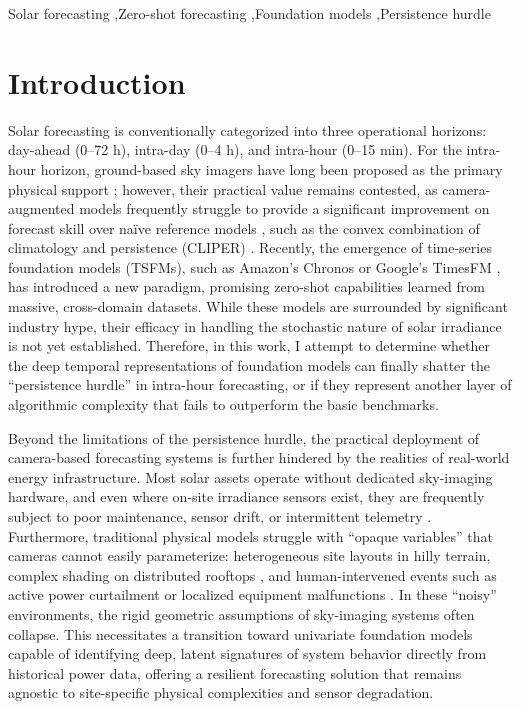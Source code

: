 \documentclass[number, 3p, 10pt, times]{elsarticle}
\begin{document}
\begin{frontmatter}
\begin{keyword}
Solar forecasting \sep Zero-shot forecasting \sep Foundation models \sep Persistence hurdle\\
\end{keyword}


\end{frontmatter}

\newpage 


\section{Introduction}\label{sec:intro}

Solar forecasting is conventionally categorized into three operational horizons: day-ahead (0--72 h), intra-day (0--4 h), and intra-hour (0--15 min). For the intra-hour horizon, ground-based sky imagers have long been proposed as the primary physical support \citep{YangBook}; however, their practical value remains contested, as camera-augmented models frequently struggle to provide a significant improvement on forecast skill over na{\"i}ve reference models \citep{Nouri2025}, such as the convex combination of climatology and persistence (CLIPER) \citep{YANG2019981}. Recently, the emergence of time-series foundation models (TSFMs), such as Amazon's Chronos \citep{Ansari2024} or Google's TimesFM \citep{Das2024}, has introduced a new paradigm, promising zero-shot capabilities learned from massive, cross-domain datasets. While these models are surrounded by significant industry hype, their efficacy in handling the stochastic nature of solar irradiance is not yet established. Therefore, in this work, I attempt to determine whether the deep temporal representations of foundation models can finally shatter the ``persistence hurdle'' in intra-hour forecasting, or if they represent another layer of algorithmic complexity that fails to outperform the basic benchmarks. 

Beyond the limitations of the persistence hurdle, the practical deployment of camera-based forecasting systems is further hindered by the realities of real-world energy infrastructure. Most solar assets operate without dedicated sky-imaging hardware, and even where on-site irradiance sensors exist, they are frequently subject to poor maintenance, sensor drift, or intermittent telemetry \citep{NIE2023171, Lin2025}. Furthermore, traditional physical models struggle with ``opaque variables'' that cameras cannot easily parameterize: heterogeneous site layouts in hilly terrain, complex shading on distributed rooftops \citep{PIERRO20171026}, and human-intervened events such as active power curtailment or localized equipment malfunctions \citep{BIRD2016577}. In these ``noisy'' environments, the rigid geometric assumptions of sky-imaging systems often collapse. This necessitates a transition toward univariate foundation models capable of identifying deep, latent signatures of system behavior directly from historical power data, offering a resilient forecasting solution that remains agnostic to site-specific physical complexities and sensor degradation.
\end{document}
